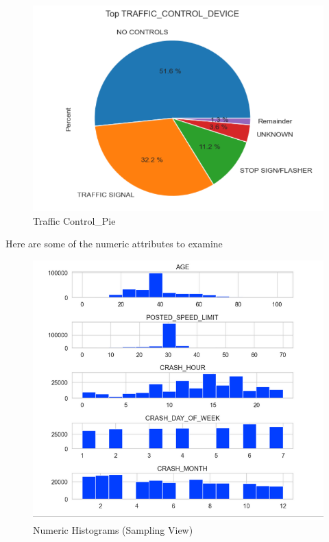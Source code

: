 \documentclass[conference]{IEEEtran}
\begin{document}
 

 \begin{figure}[!h]
	\includegraphics[width=\linewidth]{Traffic_Control_Pie.png}
	\caption{Traffic Control_Pie}
	\label{fig: Traffic_Control_Pie}
 \end{figure}
 Here are some of the numeric attributes to examine
 \begin{figure}[!h]
	\includegraphics[width=\linewidth]{Numerical_Hist.png}
	\caption{Numeric Histograms (Sampling View)}
	\label{fig: Numeric Histograms}
 \end{figure}
\end{document}
